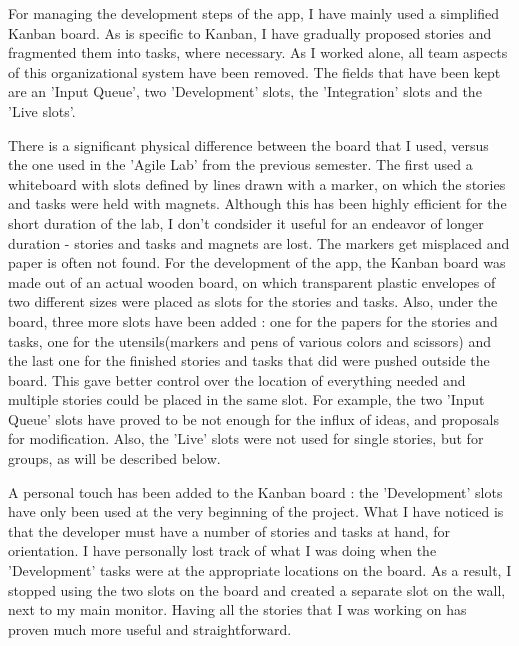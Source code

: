 \documentclass{article}
\begin{document}
For managing the development steps of the app, I have mainly used a simplified
Kanban board. As is specific to Kanban, I have gradually proposed stories and
fragmented them into tasks, where necessary. As I worked alone, all team aspects
of this organizational system have been removed. The fields that have been kept
are an 'Input Queue', two 'Development' slots, the 'Integration' slots and the
'Live slots'.\newline

There is a significant physical difference between the board that I used, versus
the one used in the 'Agile Lab' from the previous semester. The first used a
whiteboard with slots defined by lines drawn with a marker, on which the stories
and tasks were held with magnets. Although this has been highly efficient for
the short duration of the lab, I don't condsider it useful for an endeavor of
longer duration - stories and tasks and magnets are lost. The markers get
misplaced and paper is often not found. For the development of the app, the
Kanban board was made out of an actual wooden board, on which transparent
plastic envelopes of two different sizes were placed as slots for the stories
and tasks. Also, under the board, three more slots have been added : one for the
papers for the stories and tasks, one for the utensils(markers and pens of
various colors and scissors) and the last one for the finished stories and tasks
that did were pushed outside the board. This gave better control over
the location of everything needed and multiple stories could be placed
in the same slot. For example, the two 'Input Queue' slots have proved
to be not enough for the influx of ideas, and proposals for modification. Also,
the 'Live' slots were not used for single stories, but for groups, as will be
described below. \newline

A personal touch has been added to the Kanban board : the 'Development' slots
have only been used at the very beginning of the project. What I have noticed is
that the developer must have a number of stories and tasks at hand, for
orientation. I have personally lost track of what I was doing when the
'Development' tasks were at the appropriate locations on the board. As a result,
I stopped using the two slots on the board and created a separate slot on the
wall, next to my main monitor. Having all the stories that I was working on has
proven much more useful and straightforward.\newline
\end{document}
